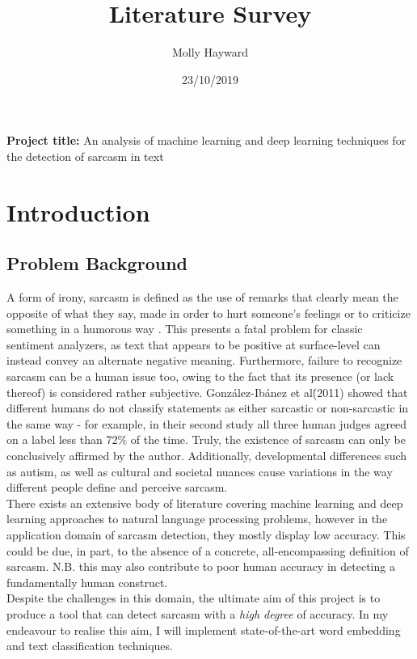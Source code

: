 \documentclass[12pt,a4paper]{article}
\title{Literature Survey}
\author{Molly Hayward}
\date{23/10/2019}
\begin{document}
\maketitle
\noindent \textbf{Project title:} An analysis of machine learning and deep learning techniques for the detection of sarcasm in text


\section{Introduction}
\subsection{Problem Background}
\noindent A form of irony, sarcasm is defined as the use of remarks that clearly mean the opposite of what they say, made in order to hurt someone's feelings or to criticize something in a humorous way \cite{cambridge2019}. This presents a fatal problem for classic sentiment analyzers, as text that appears to be positive at surface-level can instead convey an alternate negative meaning. Furthermore, failure to recognize sarcasm can be a human issue too, owing to the fact that its presence (or lack thereof) is considered rather subjective. Gonz{\'a}lez-Ib{\'a}nez et al\. (2011) \cite{gonzalez2011identifying} showed that different humans do not classify statements as either sarcastic or non-sarcastic in the same way - for example, in their second study all three human judges agreed on a label less than 72\% of the time. Truly, the existence of sarcasm can only be conclusively affirmed by the author. Additionally, developmental differences such as autism, as well as cultural and societal nuances cause variations in the way different people define and perceive sarcasm. \\

\noindent There exists an extensive body of literature covering machine learning and deep learning approaches to natural language processing problems, however in the application domain of sarcasm detection, they mostly display low accuracy. This could be due, in part, to the absence of a concrete, all-encompassing definition of sarcasm. N.B. this may also contribute to poor human accuracy in detecting a fundamentally human construct. \\

\noindent Despite the challenges in this domain, the ultimate aim of this project is to produce a tool that can detect sarcasm with a \textit{high degree} of accuracy. In my endeavour to realise this aim, I will implement state-of-the-art word embedding and text classification techniques.
\end{document}
